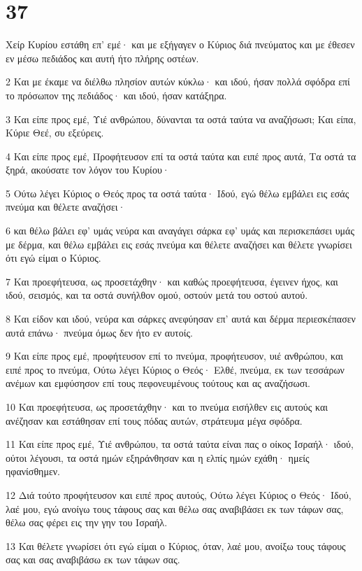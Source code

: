 \chapter{37}

\par Χείρ Κυρίου εστάθη επ' εμέ· και με εξήγαγεν ο Κύριος διά πνεύματος και με έθεσεν εν μέσω πεδιάδος και αυτή ήτο πλήρης οστέων.
\par 2 Και με έκαμε να διέλθω πλησίον αυτών κύκλω· και ιδού, ήσαν πολλά σφόδρα επί το πρόσωπον της πεδιάδος· και ιδού, ήσαν κατάξηρα.
\par 3 Και είπε προς εμέ, Υιέ ανθρώπου, δύνανται τα οστά ταύτα να αναζήσωσι; Και είπα, Κύριε Θεέ, συ εξεύρεις.
\par 4 Και είπε προς εμέ, Προφήτευσον επί τα οστά ταύτα και ειπέ προς αυτά, Τα οστά τα ξηρά, ακούσατε τον λόγον του Κυρίου·
\par 5 Ούτω λέγει Κύριος ο Θεός προς τα οστά ταύτα· Ιδού, εγώ θέλω εμβάλει εις εσάς πνεύμα και θέλετε αναζήσει·
\par 6 και θέλω βάλει εφ' υμάς νεύρα και αναγάγει σάρκα εφ' υμάς και περισκεπάσει υμάς με δέρμα, και θέλω εμβάλει εις εσάς πνεύμα και θέλετε αναζήσει και θέλετε γνωρίσει ότι εγώ είμαι ο Κύριος.
\par 7 Και προεφήτευσα, ως προσετάχθην· και καθώς προεφήτευσα, έγεινεν ήχος, και ιδού, σεισμός, και τα οστά συνήλθον ομού, οστούν μετά του οστού αυτού.
\par 8 Και είδον και ιδού, νεύρα και σάρκες ανεφύησαν επ' αυτά και δέρμα περιεσκέπασεν αυτά επάνω· πνεύμα όμως δεν ήτο εν αυτοίς.
\par 9 Και είπε προς εμέ, προφήτευσον επί το πνεύμα, προφήτευσον, υιέ ανθρώπου, και ειπέ προς το πνεύμα, Ούτω λέγει Κύριος ο Θεός· Ελθέ, πνεύμα, εκ των τεσσάρων ανέμων και εμφύσησον επί τους πεφονευμένους τούτους και ας αναζήσωσι.
\par 10 Και προεφήτευσα, ως προσετάχθην· και το πνεύμα εισήλθεν εις αυτούς και ανέζησαν και εστάθησαν επί τους πόδας αυτών, στράτευμα μέγα σφόδρα.
\par 11 Και είπε προς εμέ, Υιέ ανθρώπου, τα οστά ταύτα είναι πας ο οίκος Ισραήλ· ιδού, ούτοι λέγουσι, τα οστά ημών εξηράνθησαν και η ελπίς ημών εχάθη· ημείς ηφανίσθημεν.
\par 12 Διά τούτο προφήτευσον και ειπέ προς αυτούς, Ούτω λέγει Κύριος ο Θεός· Ιδού, λαέ μου, εγώ ανοίγω τους τάφους σας και θέλω σας αναβιβάσει εκ των τάφων σας, θέλω σας φέρει εις την γην του Ισραήλ.
\par 13 Και θέλετε γνωρίσει ότι εγώ είμαι ο Κύριος, όταν, λαέ μου, ανοίξω τους τάφους σας και σας αναβιβάσω εκ των τάφων σας.
